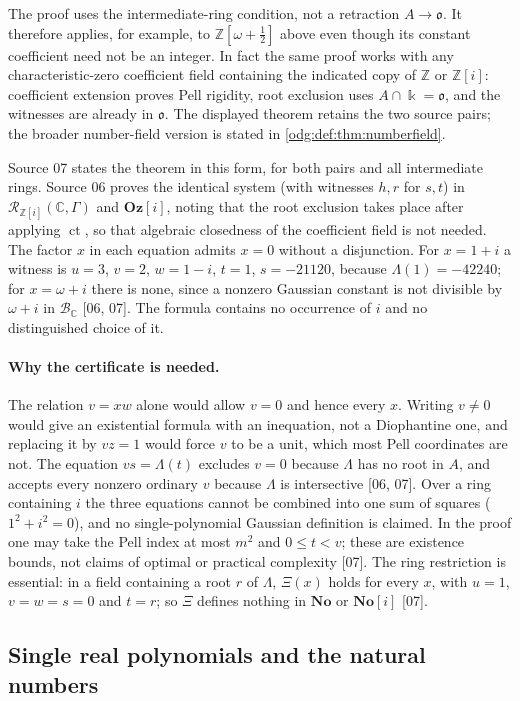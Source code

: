 \documentclass[11pt,oneside]{article}
\numberwithin{equation}{section}
\theoremstyle{definition}
\theoremstyle{remark}
\newcommand{\No}{\mathbf{No}}
\newcommand{\Oz}{\mathbf{Oz}}
\newcommand{\Z}{\mathbb Z}
\newcommand{\C}{\mathbb C}
\newcommand{\BC}{\mathcal B_{\C}}
\newcommand{\ct}{\operatorname{ct}}
\newcommand{\src}[1]{\textup{\textsf{\small[#1]}}}
\newcommand{\Og}{\Oz[i]}
\begin{document}
The proof uses the intermediate-ring condition, not a retraction
$A\to\mathfrak o$. It therefore applies, for example, to
$\Z[\omega+\tfrac12]$ above even though its constant coefficient need not be
an integer. In fact the same proof works with any characteristic-zero
coefficient field containing the indicated copy of $\Z$ or $\Z[i]$:
coefficient extension proves Pell rigidity, root exclusion uses
$A\cap\Bbbk=\mathfrak o$, and the witnesses are already in $\mathfrak o$.
The displayed theorem retains the two source pairs; the broader
number-field version is stated in \cref{odg:def:thm:numberfield}.

Source 07 states the theorem in this form, for both pairs and all
intermediate rings. Source 06 proves the identical system (with witnesses
$h,r$ for $s,t$) in $\mathcal R_{\Z[i]}(\C,\Gamma)$ and $\Og$, noting that the
root exclusion takes place after applying $\ct$, so that algebraic closedness
of the coefficient field is not needed. The factor $x$ in each equation admits
$x=0$ without a disjunction. For $x=1+i$ a witness is $u=3$, $v=2$, $w=1-i$,
$t=1$, $s=-21120$, because $\Lambda(1)=-42240$; for $x=\omega+i$ there is none,
since a nonzero Gaussian constant is not divisible by $\omega+i$ in $\BC$
\src{06, 07}. The formula contains no occurrence of $i$ and no distinguished
choice of it.

\paragraph{Why the certificate is needed.} The relation $v=xw$ alone would
allow $v=0$ and hence every $x$. Writing $v\ne0$ would give an existential
formula with an inequation, not a Diophantine one, and replacing it by
$vz=1$ would force $v$ to be a unit, which most Pell coordinates are not. The
equation $vs=\Lambda(t)$ excludes $v=0$ because $\Lambda$ has no root in $A$,
and accepts every nonzero ordinary $v$ because $\Lambda$ is intersective
\src{06, 07}. Over a ring containing $i$ the three equations cannot be
combined into one sum of squares ($1^2+i^2=0$), and no single-polynomial
Gaussian definition is claimed. In the proof one may take the Pell index at
most $m^2$ and $0\le t<v$; these are existence bounds, not claims of optimal
or practical complexity \src{07}. The ring restriction is essential: in a
field containing a root $r$ of $\Lambda$, $\Xi(x)$ holds for every $x$, with
$u=1$, $v=w=s=0$ and $t=r$; so $\Xi$ defines nothing in $\No$ or $\No[i]$
\src{07}.

\subsection{Single real polynomials and the natural numbers}
\end{document}
